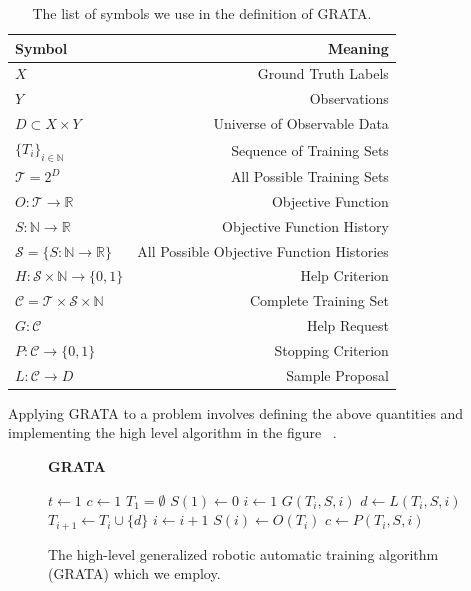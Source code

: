 \documentclass[conference]{IEEEtran}
\begin{document}
\begin{table}
  \begin{center}
  \caption{The list of symbols we use in the definition of GRATA.}
  \begin{tabular}{lr}
    \toprule
    Symbol & Meaning \\ 
    \midrule
    $X$  & Ground Truth Labels \\
    $Y$  & Observations \\
    $D \subset X \times Y$  & Universe of Observable Data \\
    $\{T_i\}_{i \in \mathbb{N}}$  & Sequence of Training Sets \\
    $\mathcal{T} = 2^D$ & All Possible Training Sets \\
    $O: \mathcal{T} \to \mathbb{R}$ & Objective Function \\
    $S: \mathbb{N} \to \mathbb{R}$  & Objective Function History \\
    $\mathcal{S} = \{S: \mathbb{N} \to \mathbb{R}\}$  & All Possible Objective Function Histories \\
    $H: \mathcal{S} \times \mathbb{N} \to \{0,1\}$  & Help Criterion \\
    $\mathcal{C} = \mathcal{T} \times \mathcal{S} \times \mathbb{N}$  & Complete Training Set \\
    $G: \mathcal{C}$  & Help Request \\
    $P: \mathcal{C} \to \{0,1\}$  & Stopping Criterion \\
    $L: \mathcal{C} \to D$  & Sample Proposal \\
  \bottomrule
  \end{tabular}
  \end{center}
\end{table}



Applying GRATA to a problem involves defining the above quantities and implementing the high level algorithm
in the figure ~\citep{}.

\begin{figure}
  \textbf{GRATA}
  \begin{algorithmic}
  \STATE $t\gets 1$
  \STATE $c\gets 1$
  \STATE $T_1 = \emptyset$
  \STATE $S(1)\gets 0$
  \STATE $i\gets 1$
      \STATE $G(T_i, S,i)$
    \ELSE
      \STATE $d\gets L(T_i, S, i)$
      \STATE $T_{i+1}\gets T_i \cup \{d\}$
    \ENDIF
    \STATE $i\gets i+1$
    \STATE $S(i)\gets O(T_i)$
    \STATE $c\gets P(T_i, S, i)$
  \ENDWHILE
  \end{algorithmic}
  \caption{The high-level generalized robotic automatic training algorithm (GRATA) which we employ.}
\end{figure}
\end{document}
